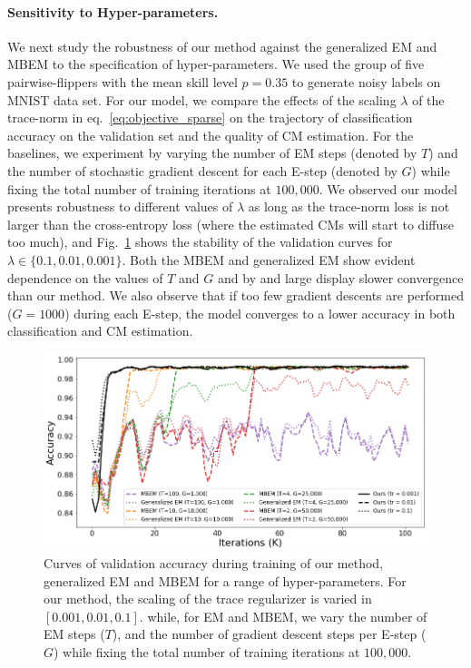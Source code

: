 \paragraph{Sensitivity to Hyper-parameters.} 
We next study the robustness of our method against the generalized EM and MBEM to the specification of hyper-parameters. We used the group of five pairwise-flippers with the mean skill level $p=0.35$ to generate noisy labels on MNIST data set. For our model, we compare the effects of the scaling $\lambda$ of the trace-norm in eq.~\ref{eq:objective_sparse} on the trajectory of classification accuracy on the validation set and the quality of CM estimation. For the baselines, we experiment by varying the number of EM steps (denoted by $T$) and the number of stochastic gradient descent for each E-step (denoted by $G$) while fixing the total number of training iterations at $100,000$. We observed our model presents robustness to different values of $\lambda$ as long as the trace-norm loss is not larger than the cross-entropy loss (where the estimated CMs will start to diffuse too much), and Fig.~\ref{fig:robustness_to_hyperparams} shows the stability of the validation curves for $\lambda \in \{0.1, 0.01, 0.001\}$. Both the MBEM and generalized EM show evident dependence on the values of $T$ and $G$ and by and large display slower convergence than our method. We also observe that if too few gradient descents are performed ($G = 1000$) during each E-step, the model converges to a lower accuracy in both classification and CM estimation.

\begin{figure}[ht]
	\centering
	\includegraphics[width=0.97\linewidth]{chapter_4/figures/figures_new/figure_5.png}
	\caption{\small Curves of validation accuracy during training of our method, generalized EM and MBEM for a range of hyper-parameters. For our method, the scaling of the trace regularizer is varied in $[0.001, 0.01, 0.1]$. while, for EM and MBEM, we vary the number of EM steps ($T$), and the number of gradient descent steps per E-step ($G$) while fixing the total number of training iterations at $100,000$.}
	\label{fig:robustness_to_hyperparams}
\end{figure}

